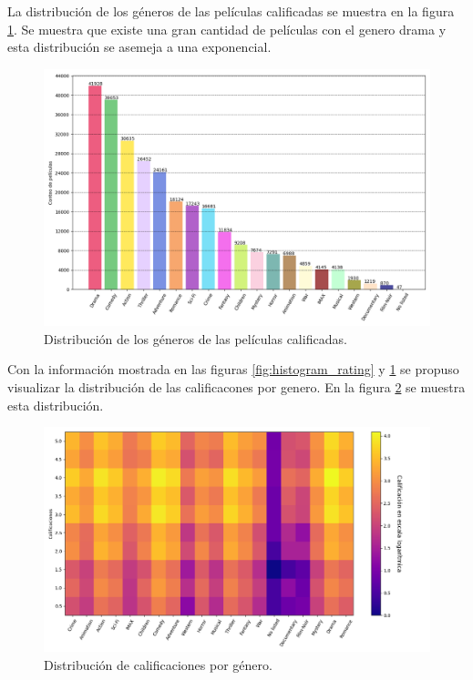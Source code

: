 La distribución de los géneros de las películas calificadas se muestra en la figura \ref{fig:histogram_genres}. Se muestra que existe una gran cantidad de películas con el genero drama y esta distribución se asemeja a una exponencial.

\begin{figure}[H]
    \centering
    \includegraphics[width=16cm]{Graphics/Problema_3_2/Histogram_genres.png}
    \caption{Distribución de los géneros de las películas calificadas.}
    \label{fig:histogram_genres}
\end{figure}

Con la información mostrada en las figuras \ref{fig:histogram_rating} y \ref{fig:histogram_genres} se propuso visualizar la distribución de las calificacones por genero. En la figura \ref{fig:distribution_rating_genre} se muestra esta distribución.

\begin{figure}[H]
    \centering
    \includegraphics[width=16cm]{Graphics/Problema_3_2/Rating_genre.png}
    \caption{Distribución de calificaciones por género.}
    \label{fig:distribution_rating_genre}
\end{figure}

